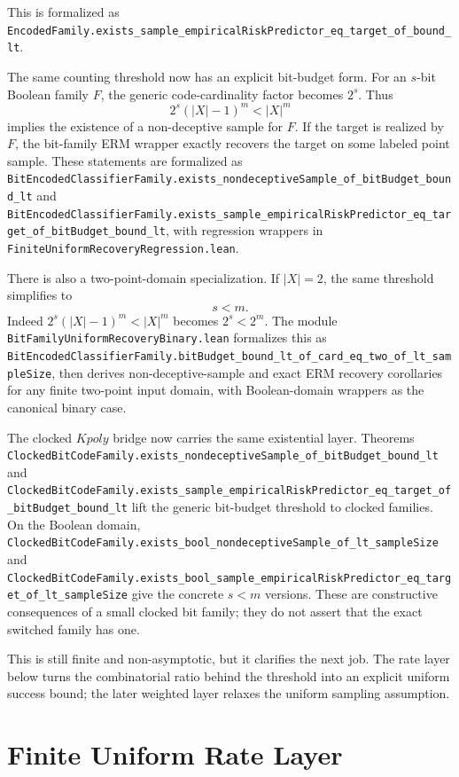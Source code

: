 \documentclass[11pt]{article}
\theoremstyle{remark}
\begin{document}
\noindent
This is formalized as
\texttt{EncodedFamily.exists\_sample\_empiricalRiskPredictor\_eq\_target\_of\_bound\_lt}.

The same counting threshold now has an explicit bit-budget form.  For an
\(s\)-bit Boolean family \(F\), the generic code-cardinality factor becomes
\(2^s\).  Thus
\[
  2^s (|X|-1)^m < |X|^m
\]
implies the existence of a non-deceptive sample for \(F\).  If the target is
realized by \(F\), the bit-family ERM wrapper exactly recovers the target on
some labeled point sample.  These statements are formalized as
\texttt{BitEncodedClassifierFamily.exists\_nondeceptiveSample\_of\_bitBudget\_bound\_lt}
and
\texttt{BitEncodedClassifierFamily.exists\_sample\_empiricalRiskPredictor\_eq\_target\_of\_bitBudget\_bound\_lt},
with regression wrappers in
\texttt{FiniteUniformRecoveryRegression.lean}.

There is also a two-point-domain specialization.  If \(|X|=2\), the same
threshold simplifies to
\[
  s < m.
\]
Indeed \(2^s(|X|-1)^m < |X|^m\) becomes \(2^s < 2^m\).  The module
\texttt{BitFamilyUniformRecoveryBinary.lean} formalizes this as
\texttt{BitEncodedClassifierFamily.bitBudget\_bound\_lt\_of\_card\_eq\_two\_of\_lt\_sampleSize},
then derives non-deceptive-sample and exact ERM recovery corollaries for any
finite two-point input domain, with Boolean-domain wrappers as the canonical
binary case.

The clocked \(Kpoly\) bridge now carries the same existential layer.  Theorems
\texttt{ClockedBitCodeFamily.exists\_nondeceptiveSample\_of\_bitBudget\_bound\_lt}
and
\texttt{ClockedBitCodeFamily.exists\_sample\_empiricalRiskPredictor\_eq\_target\_of\_bitBudget\_bound\_lt}
lift the generic bit-budget threshold to clocked families.  On the Boolean
domain, \texttt{ClockedBitCodeFamily.exists\_bool\_nondeceptiveSample\_of\_lt\_sampleSize}
and
\texttt{ClockedBitCodeFamily.exists\_bool\_sample\_empiricalRiskPredictor\_eq\_target\_of\_lt\_sampleSize}
give the concrete \(s<m\) versions.  These are constructive consequences of a
small clocked bit family; they do not assert that the exact switched family has
one.

This is still finite and non-asymptotic, but it clarifies the next job.  The
rate layer below turns the combinatorial ratio behind the threshold into an
explicit uniform success bound; the later weighted layer relaxes the uniform
sampling assumption.

\section{Finite Uniform Rate Layer}
\end{document}

